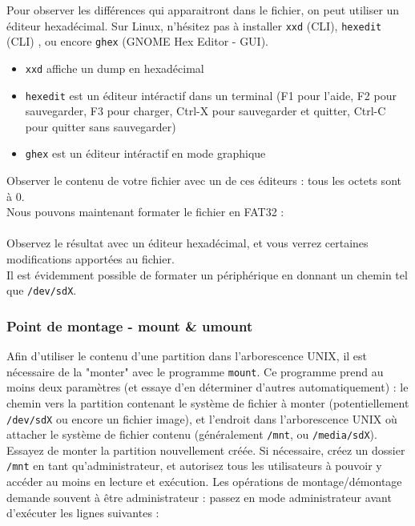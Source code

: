 Pour observer les différences qui apparaitront dans le fichier, on peut utiliser un éditeur hexadécimal.
Sur Linux, n'hésitez pas à installer \texttt{xxd} (CLI), \texttt{hexedit} (CLI) , ou encore \texttt{ghex} (GNOME Hex Editor - GUI).
\begin{itemize}
\item \texttt{xxd} affiche un dump en hexadécimal
\item \texttt{hexedit} est un éditeur intéractif dans un terminal (F1 pour l'aide, F2 pour sauvegarder, F3 pour charger, Ctrl-X pour sauvegarder et quitter, Ctrl-C pour quitter sans sauvegarder)
\item \texttt{ghex} est un éditeur intéractif en mode graphique
\end{itemize}
Observer le contenu de votre fichier avec un de ces éditeurs : tous les octets sont à $ 0 $.\\

Nous pouvons maintenant formater le fichier en FAT32 :\\

\\

Observez le résultat avec un éditeur hexadécimal, et vous verrez certaines modifications apportées au fichier.\\

Il est évidemment possible de formater un périphérique en donnant un chemin tel que \texttt{/dev/sdX}.

\bigskip

\subsubsection{Point de montage - mount \& umount}

\bigskip

Afin d'utiliser le contenu d'une partition dans l'arborescence UNIX, il est nécessaire de la "monter" avec le programme \texttt{mount}.
Ce programme prend au moins deux paramètres (et essaye d'en déterminer d'autres automatiquement) : le chemin vers la partition contenant le système de fichier à monter (potentiellement \texttt{/dev/sdX} ou encore un fichier image), et l'endroit dans l'arborescence UNIX où attacher le système de fichier contenu (généralement \texttt{/mnt}, ou \texttt{/media/sdX}).\\

Essayez de monter la partition nouvellement créée.
Si nécessaire, créez un dossier \texttt{/mnt} en tant qu'administrateur, et autorisez tous les utilisateurs à pouvoir y accéder au moins en lecture et exécution.
Les opérations de montage/démontage demande souvent à être administrateur : passez en mode administrateur avant d'exécuter les lignes suivantes :\\

